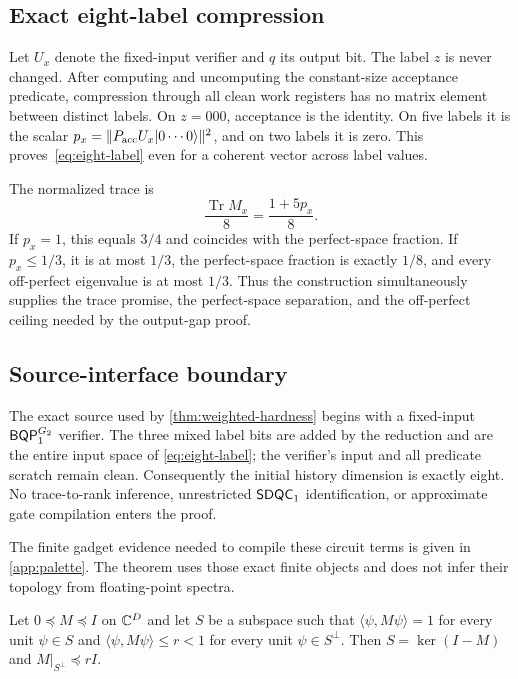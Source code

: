 \subsection{Exact eight-label compression}

Let \(U_x\) denote the fixed-input verifier and \(q\) its output bit. The label \(z\) is never changed. After computing and uncomputing the constant-size acceptance predicate, compression through all clean work registers has no matrix element between distinct labels. On \(z=000\), acceptance is the identity. On five labels it is the scalar
\(
p_x=\|P_{\rm acc}U_x\lvert 0\cdots0\rangle\|^2
\),
and on two labels it is zero. This proves~\cref{eq:eight-label} even for a coherent vector across label values.

The normalized trace is
\[
\frac{\operatorname{Tr}M_x}{8}
=\frac{1+5p_x}{8}.
\]
If \(p_x=1\), this equals \(3/4\) and coincides with the perfect-space fraction. If \(p_x\le1/3\), it is at most \(1/3\), the perfect-space fraction is exactly \(1/8\), and every off-perfect eigenvalue is at most \(1/3\). Thus the construction simultaneously supplies the trace promise, the perfect-space separation, and the off-perfect ceiling needed by the output-gap proof.

\subsection{Source-interface boundary}
\label{app:source-boundaries}

The exact source used by \cref{thm:weighted-hardness} begins with a
fixed-input \(\mathsf{BQP}_{1}^{G_2}\) verifier.  The three mixed label bits are added
by the reduction and are the entire input space of
\cref{eq:eight-label}; the verifier's input and all predicate scratch remain
clean.  Consequently the initial history dimension is exactly eight.  No
trace-to-rank inference, unrestricted \(\mathsf{SDQC}_{1}\) identification, or
approximate gate compilation enters the proof.

The finite gadget evidence needed to compile these circuit terms is given in
\cref{app:palette}.  The theorem uses those exact finite objects and does not
infer their topology from floating-point spectra.

\begin{lemma}
\label{lem:perfect-subspace}
Let \(0\preceq M\preceq I\) on \(\mathbb{C}^D\) and let \(S\) be a subspace such that
\(\langle\psi,M\psi\rangle=1\) for every unit \(\psi\in S\) and
\(\langle\psi,M\psi\rangle\le r<1\) for every unit \(\psi\in S^\perp\).  Then
\(S=\ker(I-M)\) and \(M|_{S^\perp}\preceq rI\).
\end{lemma}


